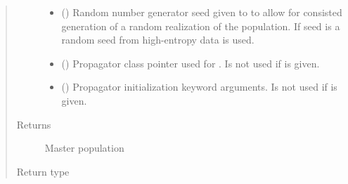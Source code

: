 \documentclass[letterpaper,10pt,english]{sphinxmanual}
\begin{document}
\begin{fulllineitems}
\begin{quote}
\begin{description}
\begin{itemize}
\item {} 
 () \textendash{} Random number generator seed given to  to allow for consisted generation of a random realization of the population. If seed is  a random seed from high-entropy data is used.

\item {} 
 ({\hyperref[\detokenize{modules/propagator_base:propagator_base.PropagatorBase}]{}}) \textendash{} Propagator class pointer used for {\hyperref[\detokenize{modules/space_object:space_object.SpaceObject}]{}}. Is not used if  is given.

\item {} 
 () \textendash{} Propagator initialization keyword arguments. Is not used if  is given.

\end{itemize}

\item[{Returns}] \leavevmode
Master population

\item[{Return type}] \leavevmode
{\hyperref[\detokenize{modules/population:population.Population}]{}}

\end{description}\end{quote}

\end{fulllineitems}


\begin{fulllineitems}
\label{\detokenize{modules/population_library:population_library.propagate_population}}
\end{fulllineitems}

\end{document}
